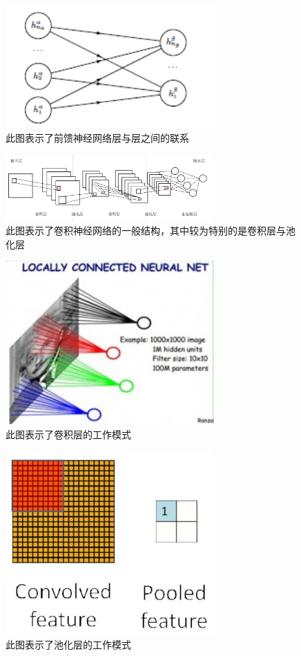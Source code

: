 \documentclass[aps,pre,12pt,preprint,onecolumn,showpacs,showkeys]{revtex4-1}
\begin{document}
\begin{figure}[t]
\centering
\includegraphics[width=80mm]{cjlj}
\caption{\label{fig:cjlj}%
此图表示了前馈神经网络层与层之间的联系}
\end{figure}
\begin{figure}[t]
\centering
\includegraphics[width=80mm]{cnnn}
\caption{\label{fig:cnnn}%
此图表示了卷积神经网络的一般结构，其中较为特别的是卷积层与池化层}
\end{figure}
\begin{figure}[t]
\centering
\includegraphics[width=80mm]{cnv}
\caption{\label{fig:cnv}%
此图表示了卷积层的工作模式}
\end{figure}
\begin{figure}[t]
\centering
\includegraphics[width=80mm]{pool}
\caption{\label{fig:pool}%
此图表示了池化层的工作模式}
\end{figure}
\end{document}
